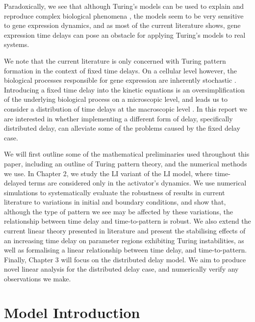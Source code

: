Paradoxically, we see that although Turing's models can be used to explain and reproduce complex biological phenomena \cite{leegaffney}, the models seem to be very sensitive to gene expression dynamics, and as most of the current literature shows, gene expression time delays can pose an obstacle for applying Turing's models to real systems.

We note that the current literature is only concerned with Turing pattern formation in the context of fixed time delays. On a cellular level however, the biological processes responsible for gene expression are inherently stochastic \cite{raj,elowitz,mcadams,paulsson}. Introducing a fixed time delay into the kinetic equations is an oversimplification of the underlying biological process on a microscopic level, and leads us to consider a distribution of time delays at the macroscopic level \cite{bratsun,krausenew}. In this report we are interested in whether implementing a different form of delay, specifically distributed delay, can alleviate some of the problems caused by the fixed delay case.

We will first outline some of the mathematical preliminaries used throughout this paper, including an outline of Turing pattern theory, and the numerical methods we use. In Chapter 2, we study the LI variant of the LI model, where time-delayed terms are considered only in the activator's dynamics. We use numerical simulations to systematically evaluate the robustness of results in current literature to variations in initial and boundary conditions, and show that, although the type of pattern we see may be affected by these variations, the relationship between time delay and time-to-pattern is robust. We also extend the current linear theory presented in literature and present the stabilising effects of an increasing time delay on parameter regions exhibiting Turing instabilities, as well as formalising a linear relationship between time delay, and time-to-pattern. Finally, Chapter 3 will focus on the distributed delay model. We aim to produce novel linear analysis for the distributed delay case, and numerically verify any observations we make.

\section{Model Introduction}
